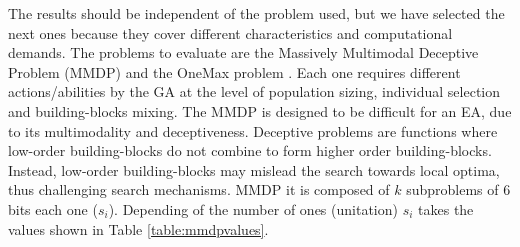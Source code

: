 The results should be independent of the problem used, but we have
selected the next ones because they cover different characteristics
and computational demands. %
 The problems to evaluate are the Massively Multimodal Deceptive
Problem (MMDP) \cite{goldberg92massive} and the OneMax problem
\cite{SchafferOnemax91}. Each one requires different actions/abilities by the GA
at the level of population sizing, individual selection and
building-blocks mixing. %
The MMDP is designed to be difficult for an EA, due to
its multimodality and deceptiveness. %
Deceptive problems are functions where low-order building-blocks do not combine to form higher order building-blocks. Instead, low-order building-blocks may mislead the search towards local optima, thus challenging search mechanisms. MMDP it is composed of $k$ subproblems of 6 bits each one ($s_i$). Depending of
the number of ones (unitation) $s_i$ takes the values shown in Table \ref{table:mmdpvalues}.  

\begin{table}
\caption{ Basic deceptive bipolar function ($s_i$) for MMDP.}
\label{table:mmdpvalues} %

\end{table}



